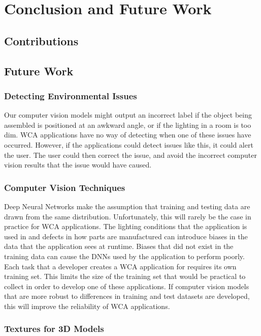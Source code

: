 \chapter{Conclusion and Future Work}\label{chap:conclusion}

\section{Contributions}

\section{Future Work}

\subsection{Detecting Environmental Issues}

Our computer vision models might output an incorrect label if the object being
assembled is positioned at an awkward angle, or if the lighting in a room is
too dim.
WCA applications have no way of detecting when one of these issues have
occurred.
However, if the applications could detect issues like this, it could alert the
user.
The user could then correct the issue, and avoid the incorrect computer vision
results that the issue would have caused.

\subsection{Computer Vision Techniques}

Deep Neural Networks make the assumption that training and testing data are
drawn from the same distribution.
Unfortunately, this will rarely be the case in practice for WCA applications.
The lighting conditions that the application is used in and defects in how parts
are manufactured can introduce biases in the data that the application sees at
runtime.
Biases that did not exist in the training data can cause the DNNs used by the
application to perform poorly.
Each task that a developer creates a WCA application for requires its own
training set.
This limits the size of the training set that would be practical to collect in
order to develop one of these applications.
If computer vision models that are more robust to differences in training and
test datasets are developed, this will improve the reliability of WCA
applications.

\subsection{Textures for 3D Models}

